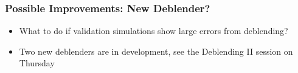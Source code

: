 \documentclass{beamer}
\begin{document}
\frame
{
    \frametitle{Possible Improvements: New Deblender?}

    \begin{itemize}

        \item What to do if validation simulations show large 
            errors from deblending?

        \item Two new deblenders are in development, see 
            the Deblending II session on Thursday

    \end{itemize}

}
\end{document}
